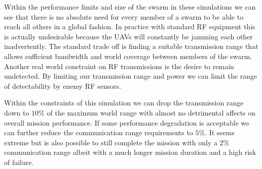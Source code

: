 \begin{multicols*}{2}





Within the performance limits and size of the swarm in these simulations we can see that there is no absolute need for every member of a swarm to be able to reach all others in a global fashion.  In practice with standard RF equipment this is actually undesirable because the UAVs will constantly be jamming each other inadvertently.  The standard trade off is finding a suitable transmission range that allows sufficient bandwidth and world coverage between members of the swarm.  Another real world constraint on RF transmissions is the desire to remain undetected.  By limiting our transmission range and power we can limit the range of detectability by enemy RF sensors.

Within the constraints of this simulation we can drop the transmission range down to $10\%$ of the maximum world range with almost no detrimental affects on overall mission performance.  If some performance degradation is acceptable we can further reduce the communication range requirements to $5\%$.  It seems extreme but is also possible to still complete the mission with only a $2\%$ communication range albeit with a much longer mission duration and a high risk of failure.


\end{multicols*}
